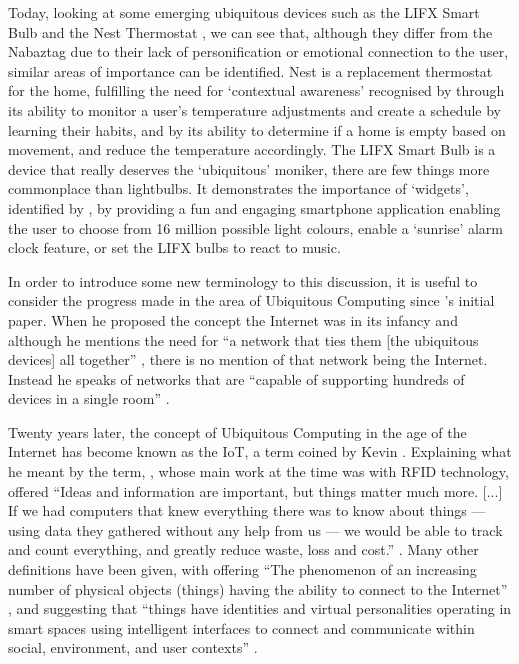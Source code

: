 \documentclass[12pt, a4paper]{article}
\begin{document}
	Today, looking at some emerging ubiquitous devices such as the LIFX Smart Bulb \parencite{lifx} and the Nest Thermostat \parencite{nestthermo}, we can see that, although they differ from the Nabaztag due to their lack of personification or emotional connection to the user, similar areas of importance can be identified.  Nest is a replacement thermostat for the home, fulfilling the need for `contextual awareness' recognised by \citeauthor{Huang2011} \parencite{Huang2011} through its ability to monitor a user's temperature adjustments and create a schedule by learning their habits, and by its ability to determine if a home is empty based on movement, and reduce the temperature accordingly. The LIFX Smart Bulb is a device that really deserves the `ubiquitous' moniker, there are few things more commonplace than lightbulbs. It demonstrates the importance of `widgets', identified by \citeauthor{Lund2009} \parencite{Lund2009}, by providing a fun and engaging smartphone application enabling the user to choose from 16 million possible light colours, enable a `sunrise' alarm clock feature, or set the LIFX bulbs to react to music.
	
	In order to introduce some new terminology to this discussion, it is useful to consider the progress made in the area of Ubiquitous Computing since \citeauthor{Weiser1991}'s initial paper. When he proposed the concept the Internet was in its infancy and although he mentions the need for ``a network that ties them [the ubiquitous devices] all together'' \parencite{Weiser1991}, there is no mention of that network being the Internet. Instead he speaks of networks that are ``capable of supporting hundreds of devices in a single room'' \parencite{Weiser1991}. 
	
	Twenty years later, the concept of Ubiquitous Computing in the age of the Internet has become known as the \ac{IoT}, a term coined by Kevin \citeauthor{Ashton2009}. Explaining what he meant by the term, \citeauthor{Ashton2009}, whose main work at the time was with \ac{RFID} technology, offered ``Ideas and information are important, but things matter much more. [...] If we had computers that knew everything there was to know about things — using data they gathered without any help from us — we would be able to track and count everything, and greatly reduce waste, loss and cost.'' \parencite{Ashton2009}. Many other definitions have been given, with \citeauthor{Butgereit2011} offering ``The phenomenon of an increasing number of physical objects (things) having the ability to connect to the Internet'' \parencite{Butgereit2011}, and \citeauthor{Tan2010} suggesting that ``things have identities and virtual personalities operating in smart spaces using intelligent interfaces to connect and communicate within social, environment, and user contexts'' \parencite{Tan2010}.
	
\end{document}
